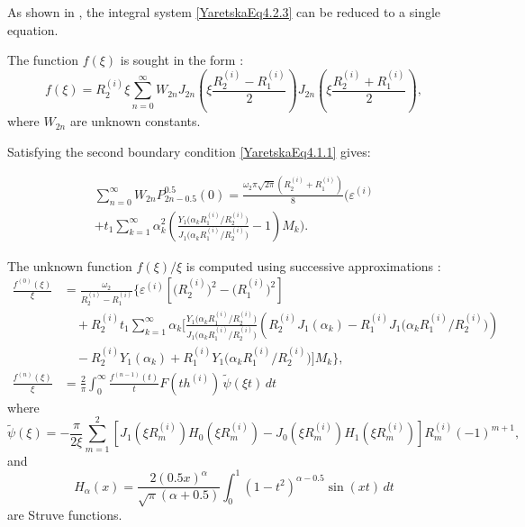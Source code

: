 As shown in \cite{YaretskaRef2}, the integral system \eqref{YaretskaEq4.2.3} can be reduced to a single equation.

The function \( f(\xi) \) is sought in the form \cite{YaretskaRef20}:
\begin{equation}
	f(\xi) = R_2^{(i)} \xi \sum_{n=0}^\infty W_{2n} J_{2n}\left( \xi \frac{R_2^{(i)} - R_1^{(i)}}{2} \right) J_{2n}\left( \xi \frac{R_2^{(i)} + R_1^{(i)}}{2} \right),
	\label{YaretskaEq4.2.5}
\end{equation}
where \( W_{2n} \) are unknown constants.

Satisfying the second boundary condition \eqref{YaretskaEq4.1.1} gives:
\begin{samepage}
\begin{multline}
	\sum_{n=0}^\infty W_{2n} P_{2n-0.5}^{0.5}(0) = \frac{\omega_2 \pi \sqrt{2\pi} (R_2^{(i)} + R_1^{(i)})}{8} \Bigg( \varepsilon^{(i)} 
	\\
	+ t_1 \sum_{k=1}^\infty \alpha_k^2 \left( \frac{Y_1\big(\alpha_k R_1^{(i)} / R_2^{(i)}\big)}{J_1\big(\alpha_k R_1^{(i)} / R_2^{(i)}\big)} - 1 \right) M_k \Bigg).
	\label{YaretskaEq4.2.8}
\end{multline}
\end{samepage}

The unknown function \( f(\xi)/\xi \) is computed using successive approximations \cite{YaretskaRef1}:
\begin{equation*}
	\begin{aligned}
		\frac{f^{(0)}(\xi)}{\xi} &= \frac{\omega_2}{R_2^{(i)} - R_1^{(i)}} \Bigg\{ \varepsilon^{(i)} \left[ \big(R_2^{(i)}\big)^2 - \big(R_1^{(i)}\big)^2 \right] \\
		&\quad + R_2^{(i)} t_1 \sum_{k=1}^\infty \alpha_k \Bigg[
		\frac{Y_1\big( \alpha_k R_1^{(i)}/R_2^{(i)} \big)}{J_1\big( \alpha_k R_1^{(i)}/R_2^{(i)} \big)} 
		\left( R_2^{(i)} J_1(\alpha_k) - R_1^{(i)} J_1\big( \alpha_k R_1^{(i)}/R_2^{(i)} \big) \right) \\
		&\quad - R_2^{(i)} Y_1(\alpha_k) + R_1^{(i)} Y_1\big( \alpha_k R_1^{(i)}/R_2^{(i)} \big)
		\Bigg] M_k \Bigg\}, \\
		\frac{f^{(n)}(\xi)}{\xi} &= \frac{2}{\pi} \int_0^\infty \frac{f^{(n-1)}(t)}{t} F(th^{(i)})\, \tilde{\psi}(\xi t)\, dt
	\end{aligned}
\end{equation*}
where
\[
\tilde{\psi}(\xi) = -\frac{\pi}{2\xi} \sum_{m=1}^{2} \left[ J_1(\xi R_m^{(i)}) H_0(\xi R_m^{(i)}) - J_0(\xi R_m^{(i)}) H_1(\xi R_m^{(i)}) \right] R_m^{(i)} (-1)^{m+1},
\]
and
\[
H_\alpha(x) = \frac{2(0.5x)^\alpha}{\sqrt{\pi}(\alpha + 0.5)} \int_0^1 (1 - t^2)^{\alpha - 0.5} \sin(xt)\, dt
\]
are Struve functions.

